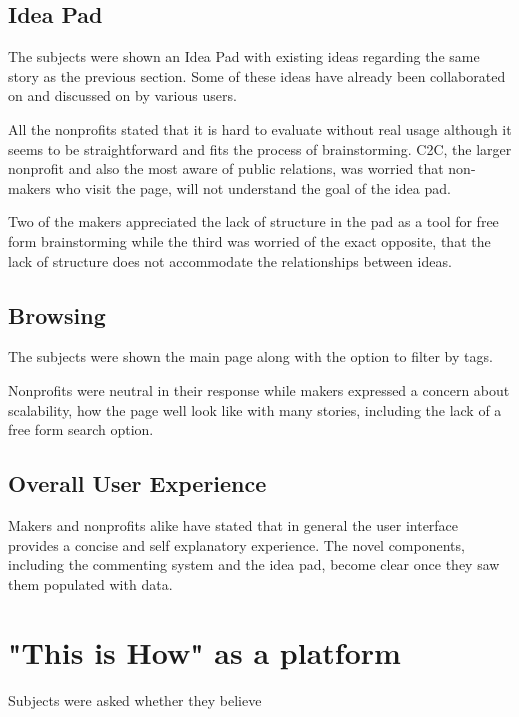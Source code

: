 \subsection{Idea Pad}

The subjects were shown an Idea Pad with existing ideas regarding the same story as the previous section. Some of these ideas have already been collaborated on and discussed on by various users.

All the nonprofits stated that it is hard to evaluate without real usage although it seems to be straightforward and fits the process of brainstorming. C2C, the larger nonprofit and also the most aware of public relations, was worried that non-makers who visit the page, will not understand the goal of the idea pad.   

Two of the makers appreciated the lack of structure in the pad as a tool for free form brainstorming while the third was worried of the exact opposite, that the lack of structure does not accommodate the relationships between ideas.

\subsection{Browsing}

The subjects were shown the main page along with the option to filter by tags.

Nonprofits were neutral in their response while makers expressed a concern about scalability, how the page well look like with many stories, including the lack of a free form search option.

\subsection{Overall User Experience}

Makers and nonprofits alike have stated that in general the user interface provides a concise and self explanatory experience. The novel components, including the commenting system and the idea pad, become clear once they saw them populated with data.     


\section{"This is How" as a platform}
Subjects were asked whether they believe 